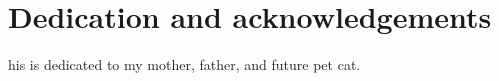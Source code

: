 %
%

\chapter*{Dedication and acknowledgements}
\begin{SingleSpace}
his is dedicated to my mother, father, and future pet cat.
\end{SingleSpace}
\clearpage